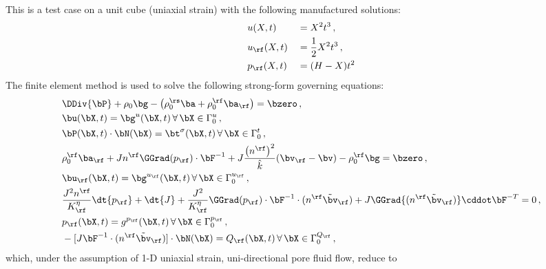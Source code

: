 This is a test case on a unit cube (uniaxial strain) with the following manufactured solutions:
\begin{align}
\label{eq:MMS_Solutions}
  \begin{aligned}
    &u(X,t) &&= X^2t^3\, ,\\
    &u_\rf(X,t) &&= \frac{1}{2}X^2t^3\, ,\\
    &p_\rf(X,t) &&= (H - X)t^2
  \end{aligned}
\end{align}
The finite element method is used to solve the following strong-form governing equations:
\begin{align}
\label{eq:Variational_Strong-Forms-MMS}
    \begin{aligned}
        &\DDiv{\bP} + \rho_0\bg - \left(\rho_0^\rs\ba + \rho_0^\rf\ba_\rf\right) = \bzero\, ,\\
        &\bu(\bX, t) = \bg^u(\bX,t)\, \forall \, \bX \in \Gamma_0^u\, ,\\
        &\bP(\bX, t) \cdot \bN(\bX) = \bt^\sigma(\bX,t) \, \forall \, \bX \in \Gamma_0^t\, ,\\
        &\rho_0^\rf\ba_\rf + Jn^\rf\GGrad(p_\rf)\cdot\bF^{-1} + J\frac{\left(n^\rf\right)^2}{\hat{k}}(\bv_\rf - \bv) - \rho_0^\rf\bg = \bzero\, ,\\
        &\bu_\rf(\bX,t) = \bg^{u_\rf}(\bX,t) \, \forall \, \bX \in \Gamma_0^{u_\rf}\, ,\\
        &\frac{J^2 n^\rf}{K^\eta_\rf}\dt{p_\rf} + \dt{J} + \frac{J^2}{K^\eta_\rf}\GGrad(p_\rf)\cdot\bF^{-1}\cdot(n^\rf\tilde{\bv}_\rf) + J\GGrad{(n^\rf\tilde{\bv}_\rf)}\cddot\bF^{-T} = 0\, ,\\
        &p_\rf(\bX,t) = g^{p_\rf}(\bX,t)\, \forall \, \bX \in \Gamma_0^{p_\rf}\, ,\\
        &-[J\bF^{-1}\cdot(n^\rf\tilde{\bv}_\rf)]\cdot\bN(\bX) = Q_\rf(\bX,t)\, \forall \, \bX \in \Gamma_0^{Q_\rf}\, ,
    \end{aligned}
\end{align}
which, under the assumption of 1-D uniaxial strain, uni-directional pore fluid flow, reduce to
